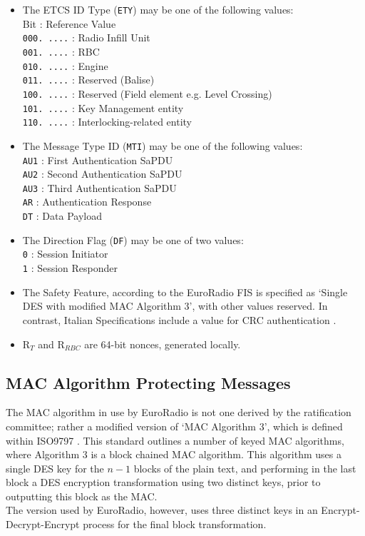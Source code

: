 \documentclass[twoside,11pt,a4paper]{article}
\newcommand{\tab}{\hspace*{1.25em}}
\begin{document}
\begin{itemize}[nolistsep]
\item The ETCS ID Type (\texttt{ETY}) may be one of the following values:\\
Bit \tab\tab\tab\space: Reference Value\\
\texttt{000. ....} : Radio Infill Unit\\
\texttt{001. ....} : RBC\\
\texttt{010. ....} : Engine\\
\texttt{011. ....} : Reserved (Balise)\\
\texttt{100. ....} : Reserved (Field element e.g. Level Crossing)\\
\texttt{101. ....} : Key Management entity\\
\texttt{110. ....} : Interlocking-related entity
\item The Message Type ID (\texttt{MTI}) may be one of the following values:\\
\texttt{AU1} : First Authentication SaPDU\\
\texttt{AU2} : Second Authentication SaPDU\\
\texttt{AU3} : Third Authentication SaPDU\\
\texttt{AR} : Authentication Response\\
\texttt{DT} : Data Payload
\item The Direction Flag (\texttt{DF}) may be one of two values:\\
\texttt{0} : Session Initiator\\
\texttt{1} : Session Responder
\item The Safety Feature, according to the EuroRadio FIS is specified as `Single DES with modified MAC Algorithm 3', with other values reserved. In contrast, Italian Specifications include a value for CRC authentication \citep{Ferrovia09a}.
\item R$_T$ and R$_{RBC}$ are 64-bit nonces, generated locally.
\end{itemize}

\subsection{MAC Algorithm Protecting Messages}
The MAC algorithm in use by EuroRadio is not one derived by the ratification committee; rather a modified version of `MAC Algorithm 3', which is defined within ISO9797 \citep{ISO9797-1}. This standard outlines a number of keyed MAC algorithms, where Algorithm 3 is a block chained MAC algorithm. This algorithm uses a single DES key for the $n-1$ blocks of the plain text, and performing in the last block a DES encryption transformation using two distinct keys, prior to outputting this block as the MAC.\\
The version used by EuroRadio, however, uses three distinct keys in an Encrypt-Decrypt-Encrypt process for the final block transformation.
\end{document}
